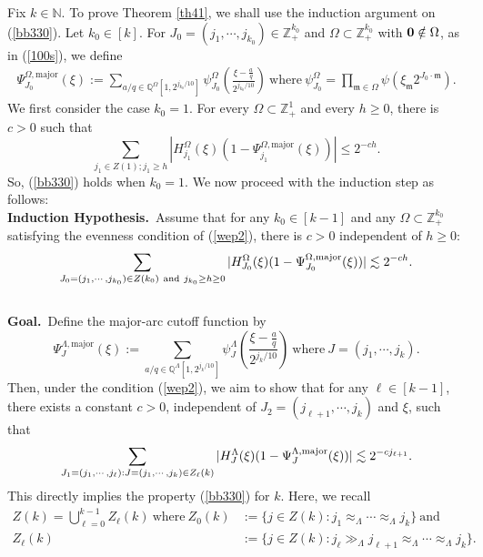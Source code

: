\documentclass[11 pt,letterpaper]{amsart}
\theoremstyle{plain}
\theoremstyle{definition}
\theoremstyle{remark} \theoremstyle{exam} \theoremstyle{ob}
\numberwithin{equation}{section}
\begin{document}
 

   Fix $k\in \mathbb{N}$. To prove  Theorem \ref{th41},  we shall use the induction argument on (\ref{bb330}).
 Let $ k_0\in  [k]$. For $J_0=(j_1,\cdots,j_{k_0})\in \mathbb{Z}^{k_0}_+$ and $\Omega\subset \mathbb{Z}_+^{k_0}$ with ${\bf 0}\notin \Omega$, as in (\ref{100s}), we  define
\begin{align*}
\Psi^{\Omega,\mathrm{major}}_{J_0}(\xi) :=\sum_{a/q \in \mathbb{Q}^{\Omega}[1, 2^{j_{k_0}/10}]}
\psi^{\Omega}_{J_0} \left( \frac{\xi- \frac{a}{q}}{2^{j_{k_0}/10}} \right)\ \text{where}\   \psi^{\Omega}_{J_0} =\prod_{\mathfrak{m}\in \Omega}\psi\left(\xi_{\mathfrak{m}} 2^{J_0\cdot \mathfrak{m}} \right).
\end{align*}
We first consider the case $k_0=1$. For  every $\Omega\subset \mathbb{Z}_+^1$ and every $h\ge 0$, there is $c>0$ such that
$$ \sum_{j_1\in Z(1); j_1\ge h}| H^{\Omega}_{j_1}(\xi) \left( 1-  \Psi^{\Omega,\mathrm{major}}_{j_1}(\xi)\right)|\le 2^{-ch}. $$ So, (\ref{bb330})  holds when  $k_0=1$.
We now proceed with the induction step as follows:\\
{\bf Induction Hypothesis.}\  Assume  that   for any $ k_0\in  [k-1]$ and any $\Omega\subset \mathbb{Z}_+^{k_0}$  satisfying the evenness condition of (\ref{wep2}),  there is $c>0$ independent of $h\ge 0$:
\begin{align}\label{bb33}
 \sum_{J_0=(j_1,\cdots,j_{k_0})\in  Z(k_0)\ \text{and}\ j_{k_0}\ge h\ge 0}|H^{\Omega}_{J_0}(\xi)(1-\Psi^{\Omega,\rm{major}}_{J_0}(\xi))|\lesssim 2^{-ch}. 
\end{align}
\\
{\bf Goal.}\  Define the major-arc cutoff  function  by
$$  \Psi^{\Lambda,\mathrm{major}}_{J}(\xi) := \sum_{a/q \in \mathbb{Q}^{\Lambda}[1, 2^{j_{k}/10}]}
\psi^{\Lambda}_{J} \left( \frac{\xi- \frac{a}{q}}{2^{j_{k}/10}} \right)\ \text{where}\ J=(j_1,\cdots,j_{k}). $$ Then,
under  the  condition (\ref{wep2}),  we aim to show that for any  $\ell\in [k-1]$, there exists a constant \( c > 0 \), independent of \( J_2=(j_{\ell+1},\cdots,j_k) \) and \( \xi \), such that 
\begin{align}\label{rpkg9}
 \sum_{J_1=(j_1,\cdots,j_\ell):J=(j_1,\cdots,j_k)\in Z_{\ell}(k)}|H^{\Lambda}_J(\xi)(1-\Psi^{\Lambda,\rm{major}}_{J}(\xi))|\lesssim 2^{-cj_{\ell+1}}.
\end{align}
This directly implies the property (\ref{bb330}) for  $k$. Here, we recall   \begin{align*}
	Z(k)=\bigcup_{\ell=0}^{k-1}Z_{\ell}(k) \ \text{where}   \	Z_0(k)&:=\{ j\in Z(k):   j_{1}\approx_{\Lambda}  \cdots\approx_{\Lambda} j_k\}\  \text{and} \\
	Z_{\ell}(k)&:=\{j\in Z(k):   j_\ell\gg_{\Lambda} j_{\ell+1}\approx_{\Lambda}\cdots\approx_{\Lambda} j_k\}. 
\end{align*}
 
\end{document}
